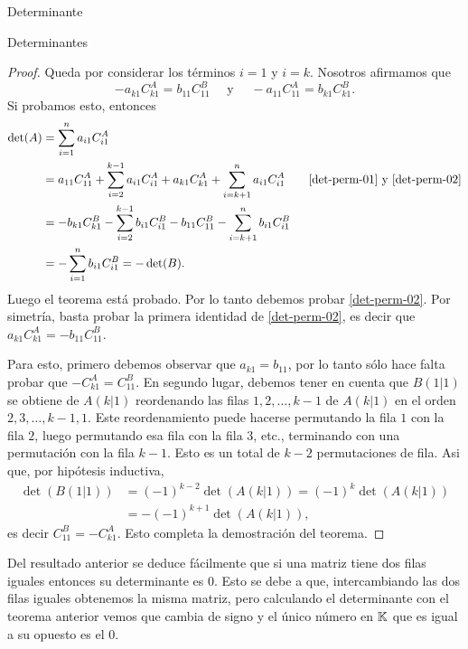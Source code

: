 \begin{chapter}{Determinante}
\begin{section}{Determinantes}
\begin{proof}
        Queda por considerar los términos $i = 1$ y $i = k$. Nosotros afirmamos que
        \begin{equation}\label{det-perm-02}
            -	a_{k1}C^A_{k1} =  b_{11}C^B_{11}  \quad \text{ y } \quad - a_{11}C^A_{11} = b_{k1}C^B_{k1}.
        \end{equation}
        Si probamos esto, entonces
        \begin{align*}
            \det(A) & = \sum_{i=1}^{n}  a_{i1}C^A_{i1}                                                                                                                                \\
                    & = a_{11}C^A_{11} +  \sum_{i=2}^{k-1}  a_{i1}C^A_{i1} + a_{k1}C^A_{k1} + \sum_{i=k+1}^{n}  a_{i1}C^A_{i1}\qquad \text{\eqref{det-perm-01} y \eqref{det-perm-02}} \\
                    & = -b_{k1}C^B_{k1} - \sum_{i=2}^{k-1}  b_{i1}C^B_{i1} - b_{11}C^B_{11} - \sum_{i=k+1}^{n}  b_{i1}C^B_{i1}                                                        \\
                    & = - \sum_{i=1}^{n}  b_{i1}C^B_{i1} =- \det(B).
        \end{align*}
        Luego el teorema está probado. Por lo tanto debemos probar \eqref{det-perm-02}. Por simetría, basta probar la primera identidad de \eqref{det-perm-02},  es decir  que $	a_{k1}C^A_{k1} = - b_{11}C^B_{11}$.

        Para esto, primero debemos observar que $a_{k1} = b_{11}$, por lo tanto sólo hace falta probar que $-C^A_{k1} = C^B_{11}$. En segundo lugar, debemos tener  en cuenta que $B(1|1)$ se obtiene de $A(k|1)$ reordenando las filas $1,2,\ldots, k -1$  de $A(k|1)$ en el orden $2,3, \ldots, k-1,1$. Este reordenamiento puede hacerse permutando la fila $1$ con la fila $2$, luego permutando esa fila con la fila $3$, etc., terminando con una permutación con la fila $k-1$. Esto es un total de $k - 2$  permutaciones de fila. Asi que, por hipótesis inductiva,
        \begin{align*}
            \det(B(1|1)) & = (-1)^{k-2}\det(A(k|1)) = (-1)^{k}\det(A(k|1)) \\
                         & = - (-1)^{k+1}\det(A(k|1)),
        \end{align*}
        es decir $C^B_{11} = -C^A_{k1}$. Esto completa la demostración del teorema.
    \end{proof}

    \begin{observacion*}
        Del resultado anterior se deduce fácilmente que si una matriz tiene dos filas iguales entonces su determinante es $0$. Esto se debe a que, intercambiando las dos filas iguales obtenemos la misma matriz, pero calculando el determinante con el teorema anterior vemos que cambia de signo y el único número en $\mathbb K$ que es igual a su opuesto es el $0$.
    \end{observacion*}


\end{section}
\end{chapter}
